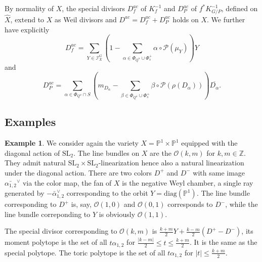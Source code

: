\documentclass{amsart}
\theoremstyle{definition}
\newtheorem{exa}[thm]{Example}
\begin{document}
By normality of $X$, the special divisors $D^{ac}_f$ of $K_f^{-1}$ and 
$D^{ac}_{P}$ of $f^*K_{G/P}^{-1}$, defined on $\hat{X}$, extend to 
$X$ as Weil divisors and $D^{ac}=D^{ac}_f+D^{ac}_{P}$ holds on $X$. 
We further have explicitly 
\[
D^{ac}_f= \sum_{Y\in \mathcal{I}_X^G}\left(1-\sum_{\alpha\in \Phi_{Q^u}\cup \Phi_s^+}\alpha\circ\mathcal{P}(\mu_Y)\right)Y
\] 
and 
\[ 
D^{ac}_{P}= \sum_{\alpha\in \Phi_{Q^u}\cap S} 
\left(m_{D_{\alpha}}-\sum_{\beta\in \Phi_{Q^u}\cup \Phi_s^+}\beta\circ\mathcal{P}(\rho(D_{\alpha}))\right)\overline{D_{\alpha}}.
\]

\subsection{Examples}

\begin{exa}
\label{exa_pic_P1xP1}
We consider again the variety $X=\mathbb{P}^1\times \mathbb{P}^1$ equipped 
with the diagonal action of $\mathrm{SL}_2$. 
The line bundles on $X$ are the $\mathcal{O}(k,m)$ for $k,m\in \mathbb{Z}$.
They admit natural $\mathrm{SL}_2\times \mathrm{SL}_2$-linearization hence also a natural 
linearization under the diagonal action. 
There are two colors $D^+$ and $D^-$ with same image $\bar{\alpha_{1,2}}^{\vee}$ via the 
color map, the fan of $X$ is the negative Weyl chamber, a single 
ray generated by $-\bar{\alpha}_{1,2}^{\vee}$ corresponding to the 
orbit $Y=\mathrm{diag}(\mathbb{P}^1)$.
The line bundle corresponding to $D^+$ is, say, $\mathcal{O}(1,0)$ and 
$\mathcal{O}(0,1)$ corresponds to $D^-$, while the line bundle 
correponding to $Y$ is obviously $\mathcal{O}(1,1)$. 

The special divisor corresponding to $\mathcal{O}(k,m)$ is 
$\frac{k+m}{2}Y+\frac{k-m}{2}(D^+-D^-)$, its moment polytope 
is the set of all $t\alpha_{1,2}$ for 
$\frac{|k-m|}{2}\leq t\leq \frac{k+m}{2}$. It is the same as the special polytope. 
The toric polytope is the set of all $t\alpha_{1,2}$ for 
$|t| \leq \frac{k+m}{2}$.
\end{exa}
\end{document}
